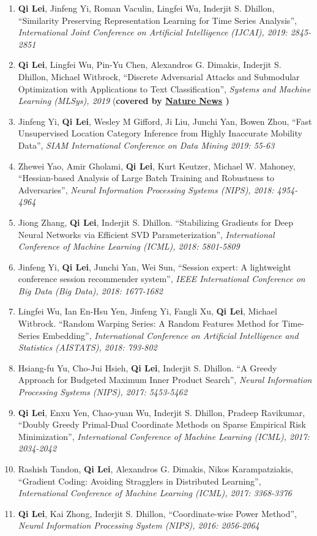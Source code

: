 \documentclass[margin, 10pt]{res} %
\begin{document}
\begin{resume}
\begin{enumerate}
  \item{ \textbf{Qi Lei}, Jinfeng Yi, Roman Vaculin, Lingfei Wu, Inderjit S. 
      Dhillon, ``Similarity Preserving Representation Learning for Time Series 
      Analysis'', \textit{International Joint Conference on Artificial 
    Intelligence (IJCAI), 2019: 2845-2851}}
  \item{\textbf{Qi Lei}, Lingfei Wu, Pin-Yu Chen, Alexandros G. Dimakis, Inderjit S. 
    Dhillon, Michael Witbrock, ``Discrete Adversarial Attacks and Submodular 
    Optimization with Applications to Text Classification'', \textit{Systems and Machine 
  Learning (MLSys), 2019} (\textbf{covered by \href{https://www.nature.com/articles/d41586-019-01510-1}{Nature News} )  } }
\item{Jinfeng Yi, \textbf{Qi Lei}, Wesley M Gifford, Ji Liu, Junchi Yan, Bowen Zhou, ``Fast Unsupervised Location Category Inference from Highly Inaccurate Mobility Data'', \textit{SIAM International Conference on Data Mining 2019: 55-63}}
\item{Zhewei Yao, Amir Gholami, \textbf{Qi Lei}, Kurt Keutzer, Michael W. 
  Mahoney, ``Hessian-based Analysis of Large Batch Training and Robustness to 
Adversaries'', \textit{Neural Information Processing Systems (NIPS), 2018: 4954-4964}}
  \item{Jiong Zhang, \textbf{Qi Lei}, Inderjit S. Dhillon. 
        ``Stabilizing Gradients for Deep 
       Neural Networks via Efficient SVD Parameterization'', \textit{
    International Conference of Machine Learning (ICML), 2018: 5801-5809}}
\item{Jinfeng Yi, \textbf{Qi Lei}, Junchi Yan, Wei Sun, ``Session expert: A lightweight conference session recommender system'', \textit{IEEE International Conference on Big Data (Big Data), 2018: 1677-1682}}
  \item{Lingfei Wu, Ian En-Hsu Yen, Jinfeng Yi, Fangli Xu, \textbf{Qi Lei}, Michael Witbrock.
    ``Random Warping Series: A Random Features Method for Time-Series Embedding'', \textit{International Conference on Artificial Intelligence and Statistics (AISTATS), 2018: 793-802}}
\item{Hsiang-fu Yu, Cho-Jui Hsieh, \textbf{Qi Lei}, Inderjit S. Dhillon. 
      ``A Greedy Approach for Budgeted Maximum 
      Inner Product Search'', \textit{Neural Information Processing Systems 
      (NIPS), 2017: 5453-5462}}
    \item{\textbf{Qi Lei}, Enxu Yen, Chao-yuan Wu, Inderjit S. Dhillon, Pradeep 
        Ravikumar, ``Doubly Greedy Primal-Dual Coordinate Methods on Sparse Empirical 
  Risk Minimization'', \textit{International Conference of Machine 
    Learning (ICML), 2017: 2034-2042}}
\item{Rashish Tandon, \textbf{Qi Lei}, 
    Alexandros G. Dimakis, Nikos Karampatziakis, ``Gradient Coding: Avoiding 
    Stragglers in Distributed Learning'', \textit{International Conference of 
  Machine Learning (ICML), 2017: 3368-3376}}
  \item {\textbf{Qi Lei},
      Kai Zhong, Inderjit S. Dhillon, ``Coordinate-wise Power Method'', 
  \textit{Neural Information Processing System (NIPS), 2016: 2056-2064}}		


\end{enumerate}
\end{resume}
\end{document}
